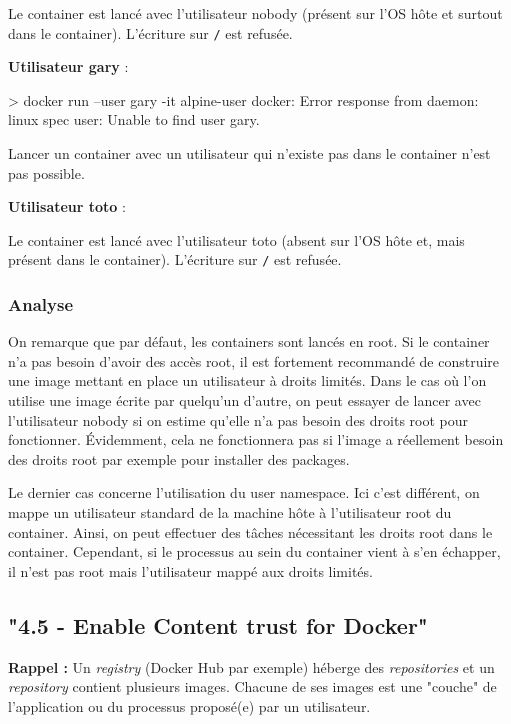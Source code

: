 \documentclass[11pt,a4paper,oneside]{report}
\newcommand{\code}[1]{\texttt{#1}}
\begin{document}
Le container est lancé avec l'utilisateur nobody (présent sur l'OS hôte et surtout dans le container). L'écriture sur \code{/} est refusée.


\textbf{Utilisateur gary} :
\begin{textcode}
> docker run --user gary -it alpine-user
docker: Error response from daemon: linux spec user: Unable to find user gary.
\end{textcode}

Lancer un container avec un utilisateur qui n'existe pas dans le container n'est pas possible.

\textbf{Utilisateur toto} :
Le container est lancé avec l'utilisateur toto (absent sur l'OS hôte et, mais présent dans le container). L'écriture sur \code{/} est refusée.

\subsubsection{Analyse}
On remarque que par défaut, les containers sont lancés en root. Si le container n'a pas besoin d'avoir des accès root, il est fortement recommandé de construire une image mettant en place un utilisateur à droits limités. Dans le cas où l'on utilise une image écrite par quelqu'un d'autre, on peut essayer de lancer avec l'utilisateur nobody si on estime qu'elle n'a pas besoin des droits root pour fonctionner. Évidemment, cela ne fonctionnera pas si l'image a réellement besoin des droits root par exemple pour installer des packages.

Le dernier cas concerne l'utilisation du user namespace. Ici c'est différent, on mappe un utilisateur standard de la machine hôte à l'utilisateur root du container. Ainsi, on peut effectuer des tâches nécessitant les droits root dans le container. Cependant, si le processus au sein du container vient à s'en échapper, il n'est pas root mais l'utilisateur mappé aux droits limités.


\subsection{"4.5  - Enable Content trust for Docker"}\label{ssc-content-trust}
\textbf{Rappel :} Un \textit{registry} (Docker Hub par exemple) héberge des \textit{repositories} et un \textit{repository} contient plusieurs images. Chacune de ses images est une "couche" de l'application ou du processus proposé(e) par un utilisateur.
\end{document}
